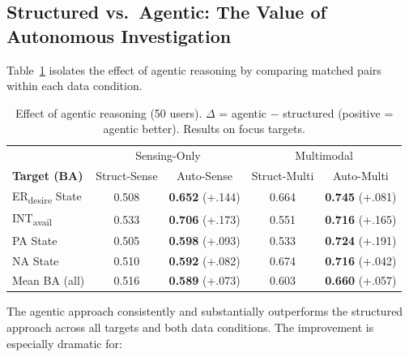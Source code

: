 \documentclass[screen,review,anonymous]{acmart}
\newcommand{\erdesire}{ER\textsubscript{desire}}
\newcommand{\intavail}{INT\textsubscript{avail}}
\begin{document}
\subsection{Structured vs.\ Agentic: The Value of Autonomous Investigation}
\label{sec:results_agentic}

Table~\ref{tab:agentic_vs_structured} isolates the effect of agentic reasoning by comparing matched pairs within each data condition.

\begin{table}[t]
\caption{Effect of agentic reasoning (50 users). $\Delta$ = agentic $-$ structured (positive = agentic better). Results on focus targets.}
\label{tab:agentic_vs_structured}
\small
\begin{tabular}{l cc cc}
\toprule
& \multicolumn{2}{c}{Sensing-Only} & \multicolumn{2}{c}{Multimodal} \\
\textbf{Target (BA)} & Struct-Sense & Auto-Sense & Struct-Multi & Auto-Multi \\
\midrule
\erdesire{} State & 0.508 & \textbf{0.652} {\scriptsize (+.144)} & 0.664 & \textbf{0.745} {\scriptsize (+.081)} \\
\intavail{} & 0.533 & \textbf{0.706} {\scriptsize (+.173)} & 0.551 & \textbf{0.716} {\scriptsize (+.165)} \\
PA State & 0.505 & \textbf{0.598} {\scriptsize (+.093)} & 0.533 & \textbf{0.724} {\scriptsize (+.191)} \\
NA State & 0.510 & \textbf{0.592} {\scriptsize (+.082)} & 0.674 & \textbf{0.716} {\scriptsize (+.042)} \\
\addlinespace
Mean BA (all) & 0.516 & \textbf{0.589} {\scriptsize (+.073)} & 0.603 & \textbf{0.660} {\scriptsize (+.057)} \\
\bottomrule
\end{tabular}
\end{table}

The agentic approach consistently and substantially outperforms the structured approach across all targets and both data conditions. The improvement is especially dramatic for:
\end{document}
